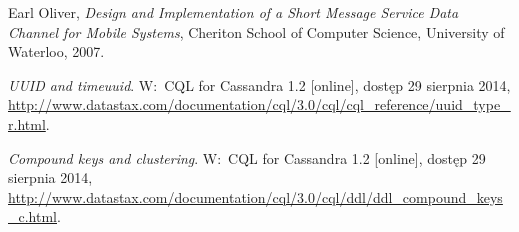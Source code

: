 \begin{thebibliography}{9}
Earl Oliver, \emph{Design and Implementation of a Short Message Service Data Channel for Mobile Systems}, Cheriton School of Computer Science, University of Waterloo, 2007.

\emph{UUID and timeuuid}. W:~CQL for Cassandra 1.2 [online], dostęp 29 sierpnia 2014, \url{http://www.datastax.com/documentation/cql/3.0/cql/cql\_reference/uuid\_type\_r.html}.

\emph{Compound keys and clustering}. W:~CQL for Cassandra 1.2 [online], dostęp 29 sierpnia 2014, \url{http://www.datastax.com/documentation/cql/3.0/cql/ddl/ddl\_compound\_keys\_c.html}.

\end{thebibliography}
